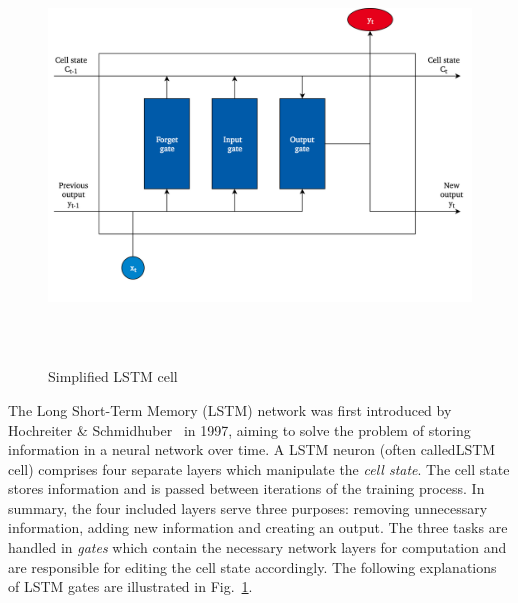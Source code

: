\begin{figure}[h]
  \centering
  \includegraphics[height=11cm]{img/lstm_cell}
  \caption{Simplified LSTM cell}
\label{fig:lstm_cell}
\end{figure}

The Long Short-Term Memory (LSTM) network was first introduced by Hochreiter \&
Schmidhuber~\cite{Hochreiter1997} in 1997, aiming to solve the problem of
storing information in a neural network over time.
A LSTM neuron (often calledLSTM cell) comprises four separate layers which 
manipulate the \textit{cell state}.
The cell state stores information and is passed between iterations of the
training process.
In summary, the four included layers serve three purposes: removing unnecessary
information, adding new information and creating an output.
The three tasks are handled in \textit{gates} which contain the necessary
network layers for computation and are responsible for editing the cell state
accordingly.
The following explanations of LSTM gates are illustrated in Fig.~\ref{fig:lstm_cell}.

